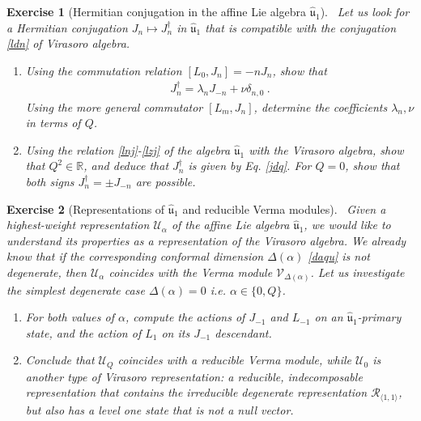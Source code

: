 \documentclass[12pt, a4paper, notitlepage, twoside]{report}
\numberwithin{equation}{section}
\theoremstyle{break}
\newtheorem{exo}{Exercise}[chapter]
\begin{document}
\begin{exo}[Hermitian conjugation in the affine Lie algebra $\hat{\mathfrak{u}}_1$]
~\label{exocuo}
Let us look for a Hermitian conjugation $J_n\mapsto J_n^\dagger$ in $\hat{\mathfrak{u}}_1$ that is compatible with the conjugation \eqref{ldn} of Virasoro algebra.
\begin{enumerate}
 \item Using the commutation relation $[L_0,J_n]=-nJ_n$, show that 
 \begin{align}
  J_n^\dagger =\lambda_n J_{-n} + \nu\delta_{n,0}\ .
 \end{align}
Using the more general commutator $[L_m,J_n]$, determine the coefficients $\lambda_n,\nu$ in terms of $Q$. 
\item 
Using the relation \eqref{lnj}-\eqref{lzj} of the algebra $\hat{\mathfrak{u}}_1$ with the Virasoro algebra, show that $Q^2\in\mathbb{R}$, and deduce that $J_n^\dagger$ is given by Eq. \eqref{jdq}. For $Q=0$, show that both signs $J_n^\dagger = \pm J_{-n}$ are possible.
\end{enumerate}

\end{exo}

\begin{exo}[Representations of $\hat{\mathfrak{u}}_1$  and reducible Verma modules]
 ~\label{exoazq}
Given a highest-weight representation $\mathcal{U}_\alpha$ of the affine Lie algebra $\hat{\mathfrak{u}}_1$, we would like to understand its properties as a representation of the Virasoro algebra. We already know that if the corresponding conformal dimension $\Delta(\alpha)$ \eqref{daqu} is not degenerate, then $\mathcal{U}_\alpha$ coincides with the Verma module $\mathcal{V}_{\Delta(\alpha)}$. Let us investigate the simplest degenerate case $\Delta(\alpha)=0$ i.e. $\alpha\in\{0, Q\}$. 
\begin{enumerate}
 \item For both values of $\alpha$, compute the actions of $J_{-1}$ and $L_{-1}$ on an $\hat{\mathfrak{u}}_1$-primary state, and the action of $L_1$ on its $J_{-1}$ descendant. 
 \item Conclude that $\mathcal{U}_Q$ coincides with a reducible Verma module, while $\mathcal{U}_0$ is another type of Virasoro representation: a reducible, indecomposable representation that contains the irreducible degenerate representation $\mathcal{R}_{\langle 1,1\rangle}$, but also has a level one state that is not a null vector.
\end{enumerate}

 
\end{exo}
\end{document}
